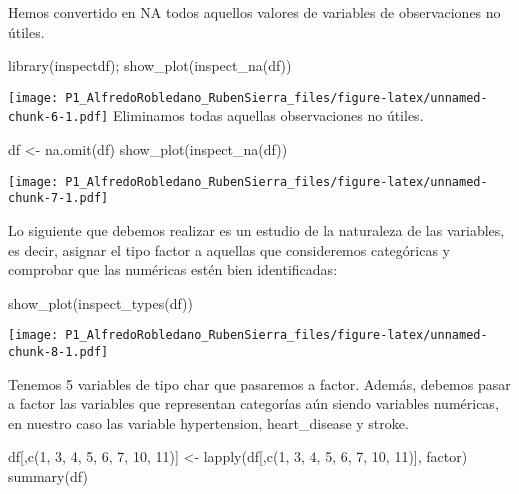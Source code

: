 \documentclass[
]{article}
\newenvironment{Shaded}{\begin{snugshade}}{\end{snugshade}}
\newcommand{\DecValTok}[1]{\textcolor[rgb]{0.00,0.00,0.81}{#1}}
\newcommand{\FunctionTok}[1]{\textcolor[rgb]{0.00,0.00,0.00}{#1}}
\newcommand{\NormalTok}[1]{#1}
\newcommand{\OtherTok}[1]{\textcolor[rgb]{0.56,0.35,0.01}{#1}}
\begin{document}
Hemos convertido en NA todos aquellos valores de variables de
observaciones no útiles.

\begin{Shaded}
\begin{Highlighting}[]
\FunctionTok{library}\NormalTok{(inspectdf);}
\FunctionTok{show\_plot}\NormalTok{(}\FunctionTok{inspect\_na}\NormalTok{(df))}
\end{Highlighting}
\end{Shaded}

\texttt{[image: P1\_AlfredoRobledano\_RubenSierra\_files/figure-latex/unnamed-chunk-6-1.pdf]}
Eliminamos todas aquellas observaciones no útiles.

\begin{Shaded}
\begin{Highlighting}[]
\NormalTok{df }\OtherTok{\textless{}{-}} \FunctionTok{na.omit}\NormalTok{(df)}
\FunctionTok{show\_plot}\NormalTok{(}\FunctionTok{inspect\_na}\NormalTok{(df))}
\end{Highlighting}
\end{Shaded}

\texttt{[image: P1\_AlfredoRobledano\_RubenSierra\_files/figure-latex/unnamed-chunk-7-1.pdf]}

Lo siguiente que debemos realizar es un estudio de la naturaleza de las
variables, es decir, asignar el tipo factor a aquellas que consideremos
categóricas y comprobar que las numéricas estén bien identificadas:

\begin{Shaded}
\begin{Highlighting}[]
\FunctionTok{show\_plot}\NormalTok{(}\FunctionTok{inspect\_types}\NormalTok{(df))}
\end{Highlighting}
\end{Shaded}

\texttt{[image: P1\_AlfredoRobledano\_RubenSierra\_files/figure-latex/unnamed-chunk-8-1.pdf]}

Tenemos 5 variables de tipo char que pasaremos a factor. Además, debemos
pasar a factor las variables que representan categorías aún siendo
variables numéricas, en nuestro caso las variable hypertension,
heart\_disease y stroke.

\begin{Shaded}
\begin{Highlighting}[]
\NormalTok{df[,}\FunctionTok{c}\NormalTok{(}\DecValTok{1}\NormalTok{, }\DecValTok{3}\NormalTok{, }\DecValTok{4}\NormalTok{, }\DecValTok{5}\NormalTok{, }\DecValTok{6}\NormalTok{, }\DecValTok{7}\NormalTok{, }\DecValTok{10}\NormalTok{, }\DecValTok{11}\NormalTok{)] }\OtherTok{\textless{}{-}} \FunctionTok{lapply}\NormalTok{(df[,}\FunctionTok{c}\NormalTok{(}\DecValTok{1}\NormalTok{, }\DecValTok{3}\NormalTok{, }\DecValTok{4}\NormalTok{, }\DecValTok{5}\NormalTok{, }\DecValTok{6}\NormalTok{, }\DecValTok{7}\NormalTok{, }\DecValTok{10}\NormalTok{, }\DecValTok{11}\NormalTok{)], factor)}
\FunctionTok{summary}\NormalTok{(df)}
\end{Highlighting}
\end{Shaded}
\end{document}

